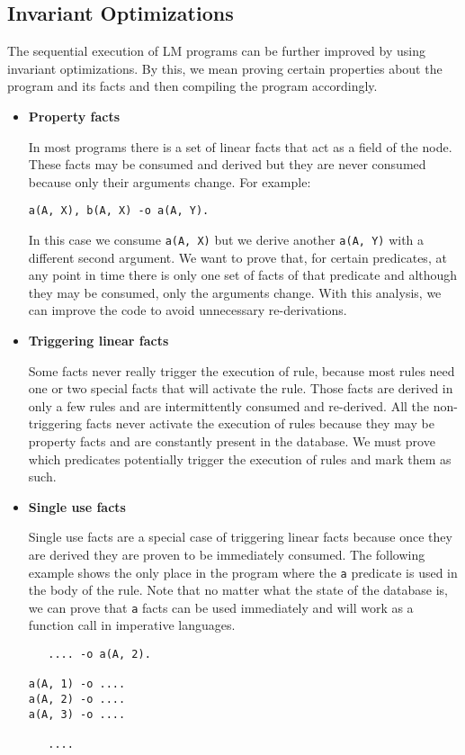 \subsection{Invariant Optimizations}

The sequential execution of LM programs can be further improved by using invariant optimizations.
By this, we mean proving certain properties about the program and its facts and then compiling the program accordingly.

\begin{itemize}
   
   \item \textbf{Property facts}
   
   In most programs there is a set of linear facts that act as a field of the node. These facts may
   be consumed and derived but they are never consumed because only their arguments change.
   For example:

\begin{Verbatim}
a(A, X), b(A, X) -o a(A, Y).
\end{Verbatim}

   In this case we consume \texttt{a(A, X)} but we derive another \texttt{a(A, Y)} with a different
   second argument. We want to prove that, for certain predicates, at any point in time there is only one
   set of facts of that predicate and although they may be consumed, only the arguments change.
   With this analysis, we can improve the code to avoid unnecessary re-derivations.
   
   \item \textbf{Triggering linear facts}
   
   Some facts never really trigger the execution of rule, because most rules need one or two special facts that
   will activate the rule. Those facts are derived in only a few rules and are intermittently consumed and
   re-derived. All the non-triggering facts never activate the execution of rules because they may be
   property facts and are constantly present in the database.
   We must prove which predicates potentially trigger the execution of rules and mark them as such.
   
   \item \textbf{Single use facts}
   
   Single use facts are a special case of triggering linear facts because once they are derived they are
   proven to be immediately consumed. The following example shows the only place in the program where
   the \texttt{a} predicate is used in the body of the rule. Note that no matter what the state of
   the database is, we can prove that \texttt{a} facts can be used immediately and will work as a function
   call in imperative languages.
   
   \begin{Verbatim}
   .... -o a(A, 2).

a(A, 1) -o ....
a(A, 2) -o ....
a(A, 3) -o ....

   ....
   \end{Verbatim}
    
\end{itemize}

